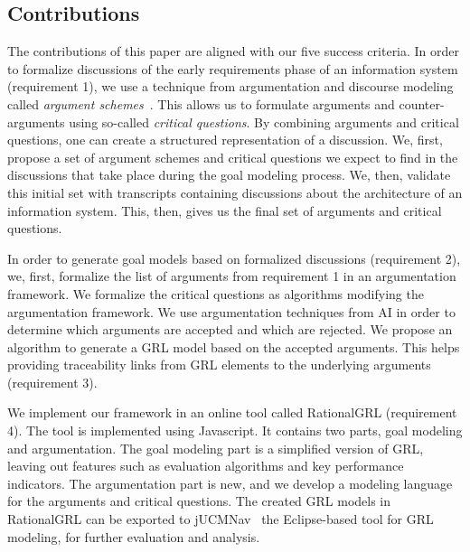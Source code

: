 
\subsection{Contributions} 

The contributions of this paper are aligned with our five %
 success criteria. In order to formalize discussions of the early requirements phase of an information system (requirement 1), we use a technique from argumentation and discourse modeling called \emph{argument schemes}~\cite{walton-etal2004}. This allows us to formulate arguments and counter-arguments using so-called \emph{critical questions}. By combining arguments and critical questions, one can create a structured representation of a discussion. We, first, propose a set of argument schemes and critical questions we expect to find in the discussions that take place during the goal modeling process. We, then, validate this initial set with transcripts containing discussions about the architecture of an information system. This, then, gives us the final set of arguments and critical questions.

In order to generate goal models based on formalized discussions (requirement 2), we, first, formalize the list of arguments from requirement 1 in an argumentation framework. We formalize the critical questions as algorithms modifying the argumentation framework. We use argumentation techniques from AI in order to determine which arguments are accepted and which are rejected. We propose an algorithm to generate a GRL model based on the accepted arguments. This helps providing traceability links from GRL elements to the underlying arguments (requirement 3).

We implement our framework in an online tool called RationalGRL (requirement 4). The tool is implemented using Javascript. It contains  two parts, goal modeling and argumentation. The goal modeling part is a simplified version of GRL, leaving out features such as evaluation algorithms and key performance indicators. The argumentation part is new, and we develop a modeling language for the arguments and critical questions. The created GRL models in RationalGRL can be exported to jUCMNav~\cite{} %
 the Eclipse-based tool for GRL modeling, for further evaluation and analysis. 

